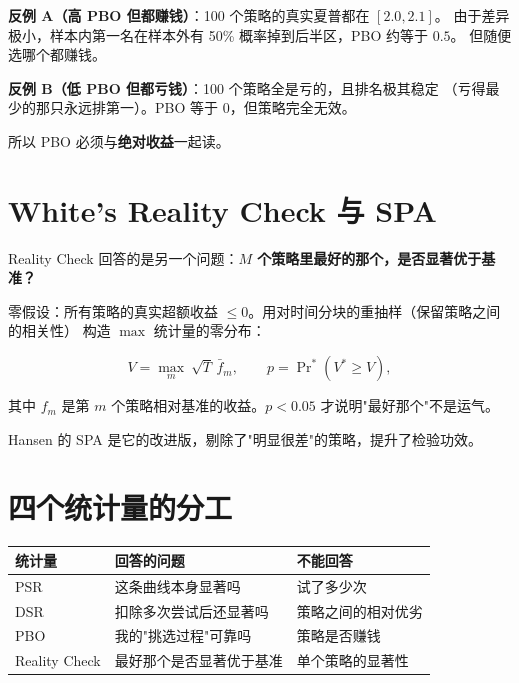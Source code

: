 \begin{warnbox}[两个反例]
\textbf{反例 A（高 PBO 但都赚钱）}：100 个策略的真实夏普都在 $[2.0, 2.1]$。
由于差异极小，样本内第一名在样本外有 50\% 概率掉到后半区，PBO 约等于 $0.5$。
但随便选哪个都赚钱。

\textbf{反例 B（低 PBO 但都亏钱）}：100 个策略全是亏的，且排名极其稳定
（亏得最少的那只永远排第一）。PBO 等于 $0$，但策略完全无效。

所以 PBO 必须与\textbf{绝对收益}一起读。
\end{warnbox}

\section{White's Reality Check 与 SPA}

Reality Check 回答的是另一个问题：\textbf{$M$ 个策略里最好的那个，是否显著优于基准？}

零假设：所有策略的真实超额收益 $\le 0$。用对时间分块的重抽样（保留策略之间的相关性）
构造 $\max$ 统计量的零分布：

\begin{equation}
  V = \max_{m}\ \sqrt{T}\,\bar f_m,
  \qquad
  p = \Pr\nolimits^{*}\!\left(V^* \ge V\right),
\end{equation}

其中 $f_m$ 是第 $m$ 个策略相对基准的收益。$p<0.05$ 才说明"最好那个"不是运气。

Hansen 的 SPA 是它的改进版，剔除了"明显很差"的策略，提升了检验功效。

\section{四个统计量的分工}

\begin{center}
\begin{longtable}{@{}p{}p{}p{}@{}}
\toprule
\textbf{统计量} & \textbf{回答的问题} & \textbf{不能回答} \\
\midrule
\endhead
PSR & 这条曲线本身显著吗 & 试了多少次 \\
DSR & 扣除多次尝试后还显著吗 & 策略之间的相对优劣 \\
PBO & 我的"挑选过程"可靠吗 & 策略是否赚钱 \\
Reality Check & 最好那个是否显著优于基准 & 单个策略的显著性 \\
\bottomrule
\end{longtable}
\end{center}

